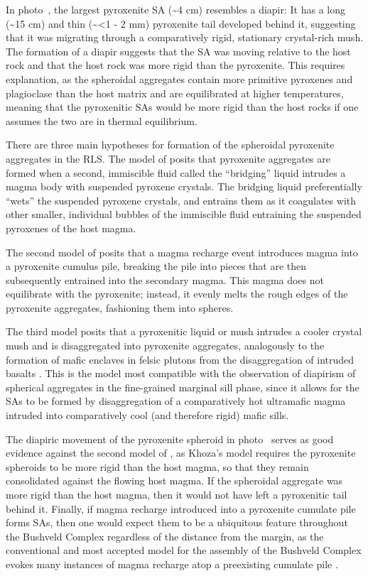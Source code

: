 In photo~, the largest pyroxenite SA (\textasciitilde4 cm) resembles a
diapir: It has a long (\textasciitilde15 cm) and thin
(\textasciitilde\textless1 - 2 mm) pyroxenite tail developed behind it,
suggesting that it was migrating through a comparatively rigid,
stationary crystal-rich mush. The formation of a diapir suggests that
the SA was moving relative to the host rock and that the host rock was
more rigid than the pyroxenite. This requires explanation, as the
spheroidal aggregates contain more primitive pyroxenes and plagioclase
than the host matrix and are equilibrated at higher temperatures,
meaning that the pyroxenitic SAs would be more rigid than the host rocks
if one assumes the two are in thermal equilibrium.

There are three main hypotheses for formation of the spheroidal
pyroxenite aggregates in the RLS. The model of \citet{lee1979}
posits that pyroxenite aggregates are formed when a second, immiscible
fluid called the ``bridging'' liquid intrudes a magma body with
suspended pyroxene crystals. The bridging liquid preferentially ``wets''
the suspended pyroxene crystals, and entrains them as it coagulates with
other smaller, individual bubbles of the immiscible fluid entraining the
suspended pyroxenes of the host magma.

The second model of \citet{khoza2021} posits that a magma recharge event
introduces magma into a pyroxenite cumulus pile, breaking the pile into
pieces that are then subsequently entrained into the secondary magma.
This magma does not equilibrate with the pyroxenite; instead, it evenly
melts the rough edges of the pyroxenite aggregates, fashioning them into
spheres.

The third model posits that a pyroxenitic liquid or mush intrudes a
cooler crystal mush and is disaggregated into pyroxenite aggregates,
analogously to the formation of mafic enclaves in felsic plutons from
the disaggregation of intruded basalts \citep{mitchell2023,smith2023}. This is the model most compatible with the observation of
diapirism of spherical aggregates in the fine-grained marginal sill
phase, since it allows for the SAs to be formed by disaggregation of a
comparatively hot ultramafic magma intruded into comparatively cool (and
therefore rigid) mafic sills.

The diapiric movement of the pyroxenite spheroid in photo~ serves as
good evidence against the second model of \citet{khoza2021}, as Khoza's model
requires the pyroxenite spheroids to be more rigid than the host magma,
so that they remain consolidated against the flowing host magma. If the
spheroidal aggregate was more rigid than the host magma, then it would
not have left a pyroxenitic tail behind it. Finally, if magma recharge
introduced into a pyroxenite cumulate pile forms SAs, then one would
expect them to be a ubiquitous feature throughout the Bushveld Complex
regardless of the distance from the margin, as the conventional and most
accepted model for the assembly of the Bushveld Complex evokes many
instances of magma recharge atop a preexisting cumulate pile \citep{holness2017,cawthorn2015}.

